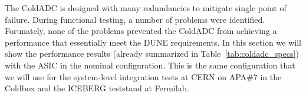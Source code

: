 \label{sec:4.}


The ColdADC is designed with many redundancies to mitigate single point of failure. During functional testing, a number of 
problems were identified. Forunately, none of the problems prevented the ColdADC from achieving a performance that 
essentially meet the DUNE requirements. In this section we will show the  performance results (already summarized 
in Table~\ref{tab:coldadc_specs}) with the ASIC in the nominal configuration.  This is the same configuration that we will 
use for the system-level integration tests at CERN on APA\#7 in the Coldbox and the ICEBERG teststand at Fermilab.
